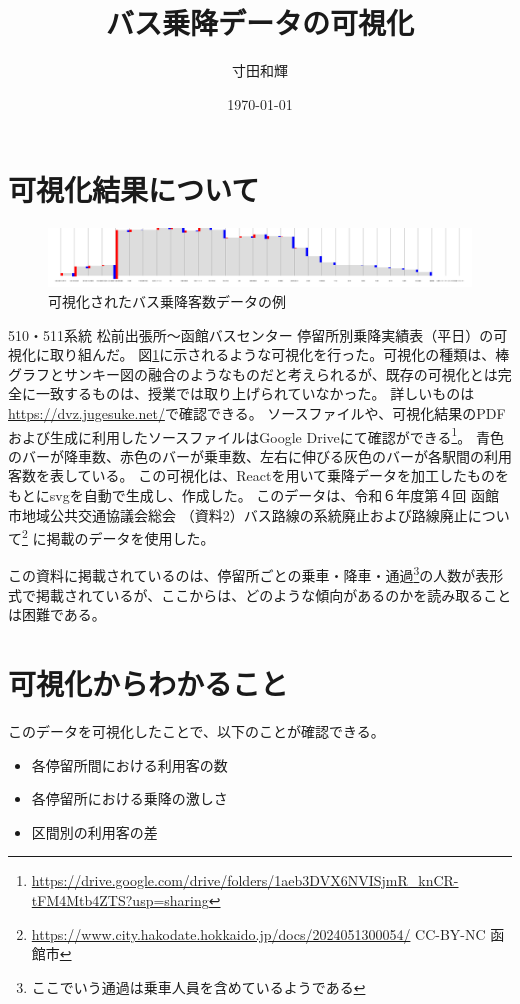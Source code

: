 \documentclass[a4paper,twocolumn,11pt]{ltjsarticle}
\title{バス乗降データの可視化}
\author{寸田和輝}
\date{\today}
\begin{document}
\maketitle

\section{可視化結果について}

\begin{figure}[b]
    \centering
    \includegraphics[width=16cm]{visualize.png}
    \caption{可視化されたバス乗降客数データの例}
    \label{fig:dvz}
\end{figure}

510・511系統 松前出張所～函館バスセンター 停留所別乗降実績表（平日）の可視化に取り組んだ。
図\ref{fig:dvz}に示されるような可視化を行った。可視化の種類は、棒グラフとサンキー図の融合のようなものだと考えられるが、既存の可視化とは完全に一致するものは、授業では取り上げられていなかった。
詳しいものは\url{https://dvz.jugesuke.net/}で確認できる。
ソースファイルや、可視化結果のPDFおよび生成に利用したソースファイルはGoogle Driveにて確認ができる\footnote{\url{https://drive.google.com/drive/folders/1aeb3DVX6NVISjmR_knCR-tFM4Mtb4ZTS?usp=sharing}}。
青色のバーが降車数、赤色のバーが乗車数、左右に伸びる灰色のバーが各駅間の利用客数を表している。
この可視化は、Reactを用いて乗降データを加工したものをもとにsvgを自動で生成し、作成した。
このデータは、令和６年度第４回 函館市地域公共交通協議会総会 （資料2）バス路線の系統廃止および路線廃止について\footnote{\url{https://www.city.hakodate.hokkaido.jp/docs/2024051300054/} CC-BY-NC 函館市} に掲載のデータを使用した。

この資料に掲載されているのは、停留所ごとの乗車・降車・通過\footnote{ここでいう通過は乗車人員を含めているようである}の人数が表形式で掲載されているが、ここからは、どのような傾向があるのかを読み取ることは困難である。

\section{可視化からわかること}

このデータを可視化したことで、以下のことが確認できる。

\begin{itemize}
    \item 各停留所間における利用客の数
    \item 各停留所における乗降の激しさ
    \item 区間別の利用客の差
\end{itemize}
\end{document}
